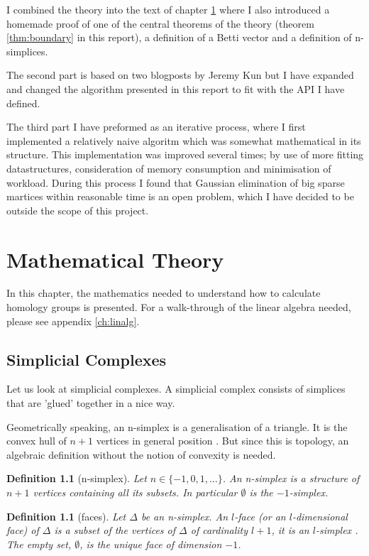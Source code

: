 \documentclass[11pt,a4paper,twoside]{report}
\newtheorem{mydef}[mythm]{Definition}
\begin{document}
I combined the theory into the text of chapter \ref{ch:theory} where I also introduced a homemade proof of one of the central theorems of the theory (theorem \ref{thm:boundary} in this report), a definition of a Betti vector and a definition of n-simplices.

The second part is based on two blogposts by Jeremy Kun \cite{KunPrimer}\cite{Kun} but I have expanded and changed the algorithm presented in this report to fit with the API I have defined.

The third part I have preformed as an iterative process, where I first implemented a relatively naive algoritm which was somewhat mathematical in its structure. This implementation was improved several times; by use of more fitting datastructures, consideration of memory consumption and minimisation of workload. During this process I found that Gaussian elimination of big sparse martices within reasonable time is an open problem, which I have decided to be outside the scope of this project.

\chapter{Mathematical Theory} \label{ch:theory}
In this chapter, the mathematics needed to understand how to calculate homology groups is presented. For a walk-through of the linear algebra needed, please see appendix \ref{ch:linalg}.

\section{Simplicial Complexes}
Let us look at simplicial complexes. A simplicial complex consists of simplices that are 'glued' together in a nice way.

Geometrically speaking, an n-simplex is a generalisation of a triangle. It is the convex hull of $n+1$ vertices in general position \cite{Nadathur}. But since this is topology, an algebraic definition without the notion of convexity is needed.

\begin{mydef}[n-simplex]
Let $n\in\{-1,0,1,\dots\}$. An n-simplex is a structure of $n+1$ vertices containing all its subsets. In particular $\emptyset$ is the $-1$-simplex.
\end{mydef}

\begin{mydef}[faces]
Let $\Delta$ be an n-simplex. An $l$-face (or an $l$-dimensional face) of $\Delta$ is a subset of the vertices of $\Delta$ of cardinality $l+1$, it is an $l$-simplex \cite{Nadathur}. The empty set, $\emptyset$, is the unique face of dimension $-1$\cite{Allgaier}.
\end{mydef}
\end{document}
